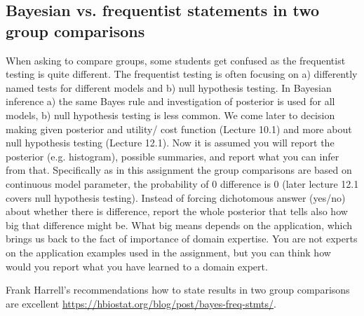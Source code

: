 \documentclass[a4paper,11pt,english]{article}
\begin{document}
\subsection*{Bayesian vs. frequentist statements in two group comparisons}

When asking to compare groups, some students get confused as the
frequentist testing is quite different. The frequentist testing is
often focusing on a) differently named tests for different models and
b) null hypothesis testing. In Bayesian inference a) the same Bayes
rule and investigation of posterior is used for all models, b) null
hypothesis testing is less common. We come later to decision making
given posterior and utility/ cost function (Lecture 10.1) and more
about null hypothesis testing (Lecture 12.1). Now it is assumed you
will report the posterior (e.g. histogram), possible summaries, and
report what you can infer from that.  Specifically as in this
assignment the group comparisons are based on continuous model
parameter, the probability of 0 difference is 0 (later lecture 12.1
covers null hypothesis testing). Instead of forcing dichotomous answer
(yes/no) about whether there is difference, report the whole posterior
that tells also how big that difference might be. What big means
depends on the application, which brings us back to the fact of
importance of domain expertise. You are not experts on the application
examples used in the assignment, but you can think how would you
report what you have learned to a domain expert.

Frank Harrell's recommendations how to state results in two group
comparisons are excellent
\url{https://hbiostat.org/blog/post/bayes-freq-stmts/}.
\end{document}
